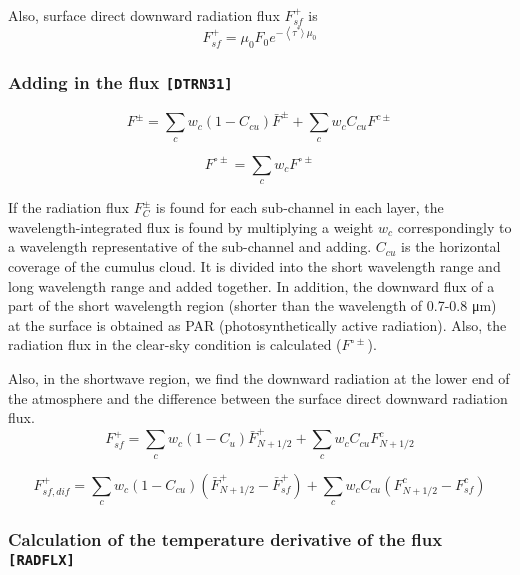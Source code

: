 Also, surface direct downward radiation flux \(F_{s f}^{+}\) is \begin{equation}
F_{s f}^{+}=\mu_{0} F_{0} e^{-\left\langle\tau^{*}\rangle\ \mu_{0}\right.}
\end{equation}

\hypertarget{adding-in-the-flux-dtrn31}{%
\subsubsection{\texorpdfstring{Adding in the flux
\texttt{{[}DTRN31{]}}}{Adding in the flux {[}DTRN31{]}}}\label{adding-in-the-flux-dtrn31}}

\begin{equation}
F^{\pm}=\sum_{c} w_{c}\left(1-C_{c u}\right) \bar{F}^{\pm}+\sum_{c} w_{c} C_{c u} F^{c \pm}
\end{equation}

\begin{equation}
F^{\circ \pm}=\sum_{c} w_{c} F^{\circ \pm}
\end{equation}

If the radiation flux \(F_{C}^{\pm}\) is found for each sub-channel in
each layer, the wavelength-integrated flux is found by multiplying a
weight \(w_c\) correspondingly to a wavelength representative of the
sub-channel and adding. \(C_{cu}\) is the horizontal coverage of the
cumulus cloud. It is divided into the short wavelength range and long
wavelength range and added together. In addition, the downward flux of a
part of the short wavelength region (shorter than the wavelength of
0.7-0.8 μm) at the surface is obtained as PAR (photosynthetically active
radiation). Also, the radiation flux in the clear-sky condition is
calculated (\(F^{\circ \pm}\)).

Also, in the shortwave region, we find the downward radiation at the
lower end of the atmosphere and the difference between the surface
direct downward radiation flux. \begin{equation}
F_{s f}^{+}=\sum_{c} w_{c}\left(1-C_{u}\right) \bar{F}_{N+1 / 2}^{+}+\sum_{c} w_{c} C_{c u} F_{N+1 / 2}^{c}
\end{equation}

\begin{equation}
F_{s f, d i f}^{+}=\sum_{c} w_{c}\left(1-C_{c u}\right)\left(\bar{F}_{N+1 / 2}^{+}-\bar{F}_{s f}^{+}\right)+\sum_{c} w_{c} C_{c u}\left(F_{N+1 / 2}^{c}-F_{s f}^{c}\right)
\end{equation}

\hypertarget{calculation-of-the-temperature-derivative-of-the-flux-radflx}{%
\subsubsection{\texorpdfstring{Calculation of the temperature derivative
of the flux
\texttt{{[}RADFLX{]}}}{Calculation of the temperature derivative of the flux {[}RADFLX{]}}}\label{calculation-of-the-temperature-derivative-of-the-flux-radflx}}


